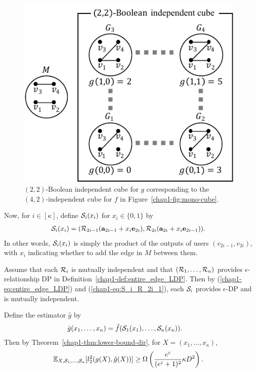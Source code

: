 {\begin{figure}[t]
  \centering
  \includegraphics[width=0.88\linewidth]{fig/BoolCube.pdf}
  \vspace{-4mm}
  \caption{
    $(2,2)$-Boolean independent cube for $g$ corresponding to the $(4,2)$-independent cube for $f$ in Figure~\ref{chap1-fig:mono-cube}.
  }\label{chap1-fig:Bool-cube}
\end{figure}

Now, for $i \in [\kappa]$, define $\mathcal{S}_i(x_i)$ for $x_i \in \{0,1\}$ by
\begin{align}
  \mathcal{S}_i(x_i) = (\mathcal{R}_{2i-1}(\mathbf{a}_{2i-1} + x_i \mathbf{e}_{2i}),
  \mathcal{R}_{2i}(\mathbf{a}_{2i} + x_i \mathbf{e}_{2i-1})).
  \label{chap1-eq:S_i_R_2i_1}
\end{align}
In other words, $\mathcal{S}_i(x_i)$ is simply the product of the outputs of users
$(v_{2i-1}, v_{2i})$, with $x_i$ indicating whether to add the edge in $M$ between them.

Assume that each $\mathcal{R}_i$ is mutually independent and that $(\mathcal{R}_1, \ldots, \mathcal{R}_n)$ provides $\epsilon$-relationship DP in Definition~\ref{chap1-def:entire_edge_LDP}. 
Then by (\ref{chap1-eq:entire_edge_LDP}) and (\ref{chap1-eq:S_i_R_2i_1}), each $\mathcal{S}_i$ provides $\epsilon$-DP and is mutually independent.

Define the estimator $\hat{g}$ by
\begin{align*}
  \hat{g}(x_1, \ldots, x_\kappa) &= \tilde{f}(\mathcal{S}_1(x_1), \ldots,
  \mathcal{S}_\kappa(x_\kappa)).
\end{align*}
Then by 
Theorem~\ref{chap1-thm:lower-bound-dir}, 
for 
$X=(x_1, \ldots, x_\kappa)$, 
\[
  \mathbb{E}_{X,\mathcal{S}_1, \ldots, \mathcal{S}_\kappa}[l_2^2(g(X), \hat{g}(X) )] \geq \Omega \left(
  \frac{e^{\varepsilon}}{(e^{\varepsilon}+1)^2} \kappa D^2 \right).
\]

}
